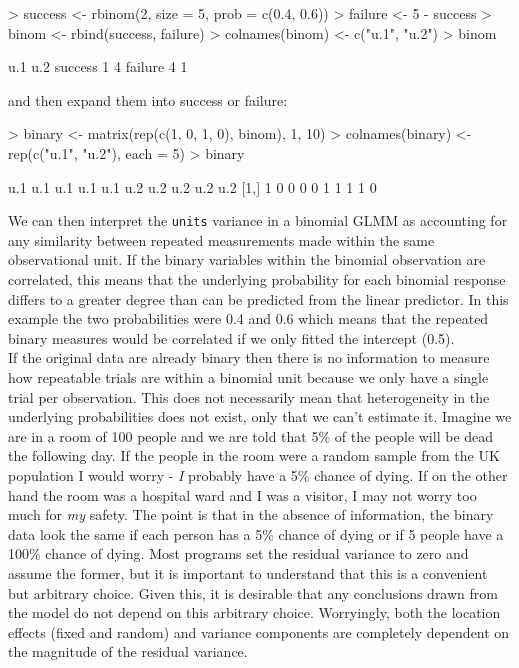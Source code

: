 \documentclass{article}
\begin{document}
\begin{Schunk}
\begin{Sinput}
> success <- rbinom(2, size = 5, prob = c(0.4, 0.6))
> failure <- 5 - success
> binom <- rbind(success, failure)
> colnames(binom) <- c("u.1", "u.2")
> binom
\end{Sinput}
\begin{Soutput}
        u.1 u.2
success   1   4
failure   4   1
\end{Soutput}
\end{Schunk}

and then expand them into success or failure:

\begin{Schunk}
\begin{Sinput}
> binary <- matrix(rep(c(1, 0, 1, 0), binom), 1, 10)
> colnames(binary) <- rep(c("u.1", "u.2"), each = 5)
> binary
\end{Sinput}
\begin{Soutput}
     u.1 u.1 u.1 u.1 u.1 u.2 u.2 u.2 u.2 u.2
[1,]   1   0   0   0   0   1   1   1   1   0
\end{Soutput}
\end{Schunk}

We can then interpret the \texttt{units} variance in a binomial GLMM as accounting for any similarity between repeated measurements made within the same observational unit. If the binary variables within the binomial observation are correlated, this means that the underlying probability for each binomial response differs to a greater degree than can be predicted from the linear predictor. In this example the two probabilities were 0.4 and 0.6 which means that the repeated binary measures would be correlated if we only fitted the intercept (0.5).\\  

If the original data are already binary then there is no information to measure how repeatable trials are within a binomial unit because we only have a single trial per observation. This does not necessarily mean that heterogeneity in the underlying probabilities does not exist, only that we can't estimate it. Imagine we are in a room of 100 people and we are told that 5\% of the people will be dead the following day.  If the people in the room were a random sample from the UK population I would worry - \emph{I} probably have a 5\% chance of dying. If on the other hand the room was a hospital ward and I was a visitor, I may not worry too much for \emph{my} safety. The point is that in the absence of information, the binary data look the same if each person has a 5\% chance of dying or if 5 people have a 100\% chance of dying.  Most programs set the residual variance to zero and assume the former, but it is important to understand that this is a convenient but arbitrary choice. Given this, it is desirable that any conclusions drawn from the model do not depend on this arbitrary choice. Worryingly, both the location effects (fixed and random) and variance components are completely dependent on the magnitude of the residual variance.\\
\end{document}
